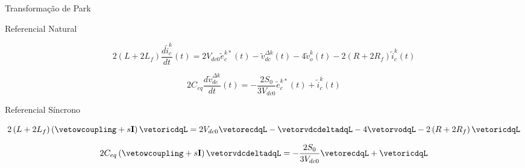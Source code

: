 \begin{frame}{Transformação de Park}

\centering
\begin{block}{Referencial Natural}


\begin{equation*}
 2\left( L + 2 L_f \right)  \frac{d \tilde{i}_c^k}{dt}(t) =   
 2V_{dc0}\tilde{e}_c^{k*}(t)
  -
  \tilde{v}_{dc}^{\Delta k}(t)  
 - 4 \tilde{v}_o^k(t) 
- 2\left(R + 2 R_f \right) \tilde{i}_c^k(t)
\end{equation*}

\begin{equation*}
2 C_{eq}  \frac{d \tilde{v}_{dc}^{\Delta k}}{dt}(t) = 
- \frac{2 S_0}{3 V_{dc0}} \tilde{e}_c^{k*}(t) 
+ \tilde{i}_c^{k}(t)
\end{equation*}

\end{block}



\begin{block}{Referencial Síncrono}

\begin{equation*}
 2\left( L + 2 L_f \right) \left( \vetowcoupling  
+  s \mathbf{I} \right)\vetoricdqL= 
   2V_{dc0} \vetorecdqL
   -  \vetorvdcdeltadqL  
 - 4 \vetorvodqL 
- 2\left(R + 2 R_f \right) \vetoricdqL
\end{equation*}

\begin{equation*}
2 C_{eq} \left( \vetowcoupling  
+  s \mathbf{I} \right) \vetorvdcdeltadqL  =
-\frac{2 S_0}{3 V_{dc0}} \vetorecdqL 
+ \vetoricdqL
\end{equation*}


\end{block}

\end{frame}





